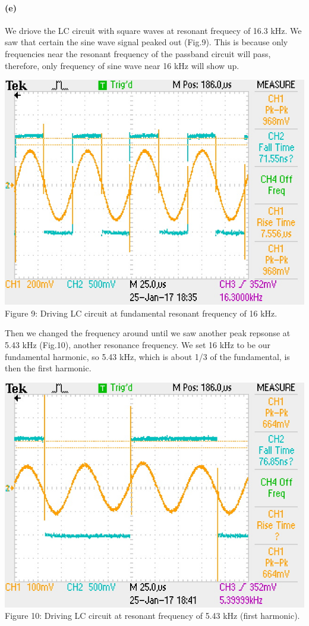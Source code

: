 \documentclass[]{article}
\begin{document}
	\paragraph{ (e)}	
	We driove the LC circuit with square waves at resonant frequecy of 16.3 kHz. We saw that certain the sine wave signal peaked out (Fig.9). This is because only frequencies near the resonant frequency of the passband circuit will pass, therefore, only frequency of sine wave near 16 kHz will show up.
		\begin{center}
			\includegraphics[scale=0.8]{e_squareResonance}\\
			Figure 9: Driving LC circuit at fundamental resonant frequency of 16 kHz.
		\end{center}
	Then we changed the frequency around until we saw another peak repsonse at 5.43 kHz (Fig.10), another resonance frequency. We set 16 kHz to be our fundamental harmonic, so 5.43 kHz, which is about 1/3 of the fundamental, is then the first harmonic.
		\begin{center}
			\includegraphics[scale=0.8]{e_54hz}\\
			Figure 10: Driving LC circuit at resonant frequency of 5.43 kHz (first harmonic).
		\end{center}
\end{document}

